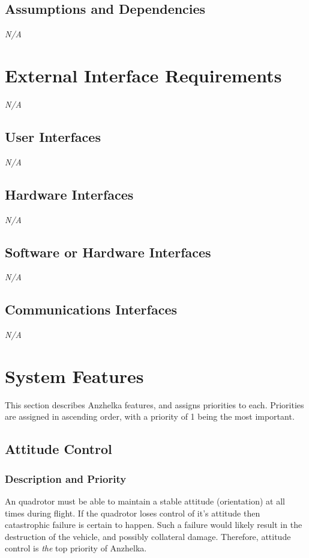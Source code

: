 \documentclass[english]{article}
\numberwithin{equation}{section} %
\begin{document}
\subsection{Assumptions and Dependencies}
\textit{N/A}

\section{External Interface Requirements}
\textit{N/A}
\subsection{User Interfaces}
\textit{N/A}
\subsection{Hardware Interfaces}
\textit{N/A}
\subsection{Software or Hardware Interfaces}
\textit{N/A}
\subsection{Communications Interfaces}
\textit{N/A}

\section{System Features}

This section describes Anzhelka features, and assigns priorities to each. Priorities are assigned in ascending order, with a priority of 1 being the most important.

\subsection{Attitude Control}
\subsubsection{Description and Priority}
An quadrotor must be able to maintain a stable attitude (orientation) at all times during flight. If the quadrotor loses control of it's attitude then catastrophic failure is certain to happen. Such a failure would likely result in the destruction of the vehicle, and possibly collateral damage. Therefore, attitude control is \textit{the} top priority of Anzhelka.
\end{document}
